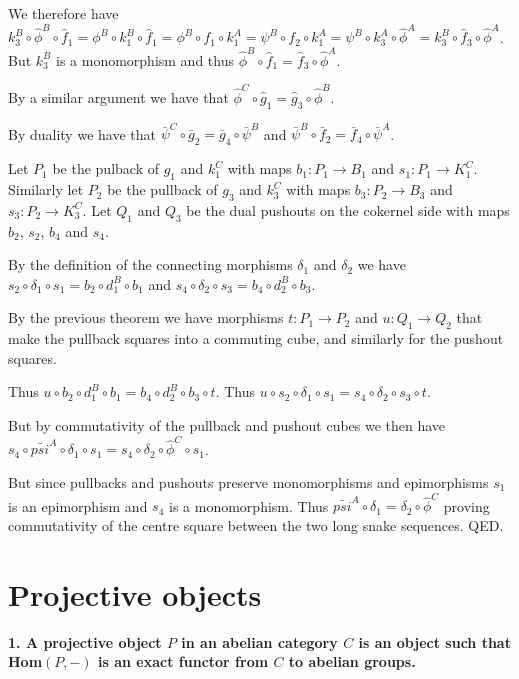 \documentclass[12pt]{article}
\begin{document}
We therefore have $k_3^B\circ \hat{\phi}^B\circ \hat{f}_1 = \phi^B\circ k_1^B\circ \hat{f}_1 = \phi^B\circ f_1\circ k_1^A = \psi^B\circ f_2\circ k_1^A = \psi^B\circ k_3^A\circ \hat{\phi}^A = k_3^B\circ \hat{f}_3\circ \hat{\phi}^A$. But $k_3^B$ is a monomorphism and thus $\hat{\phi}^B\circ \hat{f}_1 = \hat{f}_3\circ \hat{\phi}^A$. 

By a similar argument we have that $\hat{\phi}^C\circ \hat{g}_1 = \hat{g}_3\circ \hat{\phi}^B$.

By duality we have that $\bar{\psi}^C\circ \bar{g}_2 = \bar{g}_4\circ \bar{\psi}^B$ and $\bar{\psi}^B\circ \bar{f}_2 = \bar{f}_4\circ \bar{\psi}^A$. 

Let $P_1$ be the pulback of $g_1$ and $k_1^C$ with maps $b_1 : P_1 \to B_1$ and $s_1 : P_1 \to K_1^C$. Similarly let $P_2$ be the pullback of $g_3$ and $k_3^C$ with maps $b_3 : P_2 \to B_3$ and $s_3 : P_2 \to K_3^C$. Let $Q_1$ and $Q_3$ be the dual pushouts on the cokernel side with maps $b_2$, $s_2$, $b_4$ and $s_4$.

By the definition of the connecting morphisms $\delta_1$ and $\delta_2$ we have $s_2\circ \delta_1\circ s_1 = b_2\circ d_1^B\circ b_1$ and $s_4\circ \delta_2\circ s_3 = b_4\circ d_2^B\circ b_3$.

By the previous theorem we have morphisms $t : P_1 \to P_2$ and $u : Q_1 \to Q_2$ that make the pullback squares into a commuting cube, and similarly for the pushout squares.

Thus $u\circ b_2\circ d_1^B\circ b_1 = b_4\circ d_2^B\circ b_3\circ t$. Thus $u\circ s_2\circ \delta_1\circ s_1 = s_4\circ \delta_2\circ s_3\circ t$.

But by commutativity of the pullback and pushout cubes we then have $s_4\circ \bar{psi}^A\circ \delta_1\circ s_1 = s_4\circ \delta_2\circ \hat{\phi}^C\circ s_1$.

But since pullbacks and pushouts preserve monomorphisms and epimorphisms $s_1$ is an epimorphism and $s_4$ is a monomorphism. Thus $\bar{psi}^A\circ \delta_1 = \delta_2\circ \hat{\phi}^C$ proving commutativity of the centre square between the two long snake sequences. QED.

\section{Projective objects}

\textbf{1. A projective object $P$ in an abelian category $C$ is an object such that Hom$(P, -)$ is an exact functor from $C$ to abelian groups.}
\end{document}
